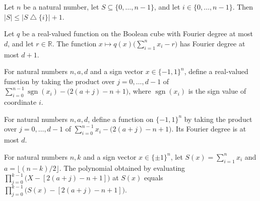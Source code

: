 \begin{theorem}
\label{FABL.card_le_card_symmDiff_singleton_add_one}
\leanok
{}
Let $n$ be a natural number, let $S\subseteq\{0,\ldots,n-1\}$, and let
$i\in\{0,\ldots,n-1\}$. Then $|S|\leq |S\mathbin{\triangle}\{i\}|+1$.
\end{theorem}

\begin{theorem}
\label{FABL.fourierDegree_mul_coordinateSum_sub_le}
\leanok
{}
Let $q$ be a real-valued function on the Boolean cube with Fourier degree at most $d$,
and let $r\in\mathbb R$. The function $x\mapsto q(x)\bigl(\sum_{i=1}^n
x_i-r\bigr)$ has Fourier degree at most $d+1$.
\end{theorem}

\begin{definition}
\label{FABL.gotsmanLinialProductOnCube}
\leanok
{}
For natural numbers $n,a,d$ and a sign vector $x\in\{-1,1\}^n$, define a real-valued
function by taking the product over $j=0,\ldots,d-1$ of
$\sum_{i=0}^{n-1}\operatorname{sgn}(x_i)-\bigl(2(a+j)-n+1\bigr)$, where
$\operatorname{sgn}(x_i)$ is the sign value of coordinate $i$.
\end{definition}

\begin{theorem}
\label{FABL.fourierDegree_gotsmanLinialProductOnCube_le}
\leanok
{}
For natural numbers $n,a,d$, define a function on $\{-1,1\}^n$ by taking the product
over $j=0,\ldots,d-1$ of $\sum_{i=0}^{n-1}x_i-\bigl(2(a+j)-n+1\bigr)$. Its Fourier
degree is at most $d$.
\end{theorem}

\begin{theorem}
\label{FABL.gotsmanLinialCubePolynomial_eq_product}
\leanok
{}
For natural numbers $n,k$ and a sign vector $x\in\{\pm1\}^n$, let $S(x)=\sum_{i=1}^n
x_i$ and $a=\lfloor(n-k)/2\rfloor$. The polynomial obtained by evaluating
$\prod_{j=0}^{k-1}\bigl(X-[2(a+j)-n+1]\bigr)$ at $S(x)$ equals
$\prod_{j=0}^{k-1}\bigl(S(x)-[2(a+j)-n+1]\bigr)$.
\end{theorem}

